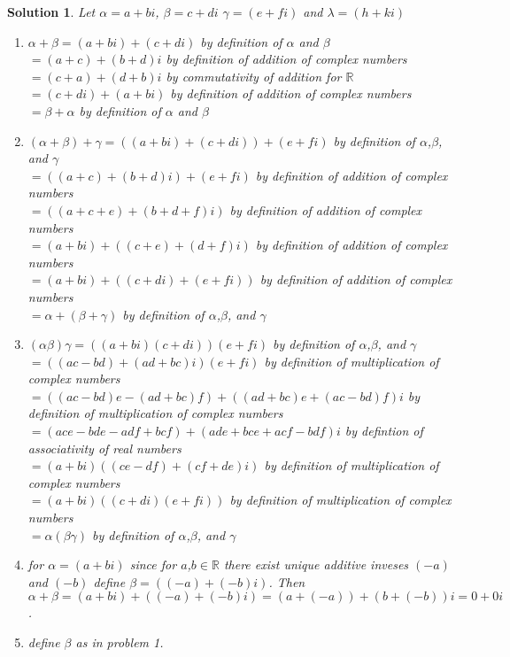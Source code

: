 \documentclass{article}
\theoremstyle{problemstyle}
\theoremstyle{problemstyle}
\newtheorem{solution}{Solution}
\begin{document}
\begin{solution}
Let $\alpha = a+bi$, $\beta = c+di$ $\gamma = (e+fi)$ and $\lambda = (h+ki)$
\begin{enumerate}
\item $\alpha + \beta = (a+bi)+(c+di)$ by definition of $\alpha$ and $\beta$\\
$= (a+c)+(b+d)i$ by definition of addition of complex numbers\\
$= (c+a)+(d+b)i$ by commutativity of addition for $\mathbb{R}$\\
$= (c+di)+(a+bi)$ by definition of addition of complex numbers\\
$= \beta + \alpha$ by definition of $\alpha$ and $\beta$
\item $(\alpha+\beta)+\gamma = ((a+bi)+(c+di))+(e+fi)$ by definition of $\alpha$,$\beta$, and $\gamma$\\
$= ((a+c)+(b+d)i)+(e+fi)$ by definition of addition of complex numbers\\
$= ((a+c+e)+(b+d+f)i)$ by definition of addition of complex numbers\\
$= (a+bi)+((c+e)+(d+f)i)$ by definition of addition of complex numbers\\
$= (a+bi)+((c+di)+(e+fi))$ by definition of addition of complex numbers\\
$= \alpha+(\beta + \gamma)$ by definition of $\alpha$,$\beta$, and $\gamma$
\item $(\alpha\beta)\gamma = ((a+bi)(c+di))(e+fi)$ by definition of $\alpha$,$\beta$, and $\gamma$\\
$= ((ac-bd)+(ad+bc)i)(e+fi)$ by definition of multiplication of complex numbers\\
$= ((ac-bd)e-(ad+bc)f)+((ad+bc)e+(ac-bd)f)i$ by definition of multiplication of complex numbers\\
$= (ace-bde-adf+bcf)+(ade+bce+acf-bdf)i$ by defintion of associativity of real numbers\\
$= (a+bi)((ce-df)+(cf+de)i)$ by definition of multiplication of complex numbers\\
$= (a+bi)((c+di)(e+fi))$ by definition of multiplication of complex numbers\\
$= \alpha(\beta\gamma)$ by definition of $\alpha$,$\beta$, and $\gamma$
\item for $\alpha = (a+bi)$ since for $a$,$b \in \mathbb{R}$ there exist unique additive inveses $(-a)$ and $(-b)$ define $\beta = ((-a)+(-b)i)$. Then $\alpha + \beta = (a+bi)+((-a)+(-b)i) = (a + (-a)) + (b + (-b))i = 0 + 0i$. 
\item define $\beta$ as in problem 1.

\end{enumerate}
\end{solution}
\end{document}

